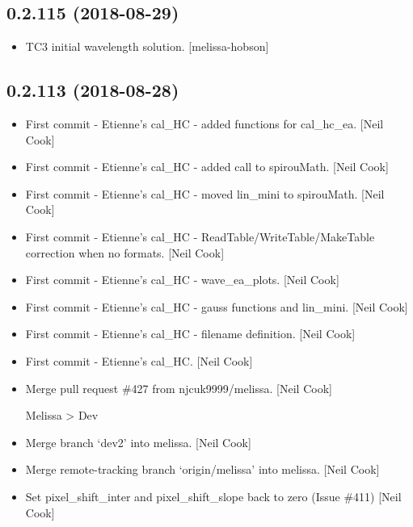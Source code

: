 \documentclass[a4paper,10pt,english]{report}
\begin{document}
\subsection{0.2.115 (2018-08-29)}
\label{\detokenize{misc/changelog:id345}}\begin{itemize}
\item {} 
TC3 initial wavelength solution. {[}melissa-hobson{]}

\end{itemize}


\subsection{0.2.113 (2018-08-28)}
\label{\detokenize{misc/changelog:id346}}\begin{itemize}
\item {} 
First commit - Etienne’s cal\_HC - added functions for cal\_hc\_ea. {[}Neil
Cook{]}

\item {} 
First commit - Etienne’s cal\_HC - added call to spirouMath. {[}Neil
Cook{]}

\item {} 
First commit - Etienne’s cal\_HC - moved lin\_mini to spirouMath. {[}Neil
Cook{]}

\item {} 
First commit - Etienne’s cal\_HC - ReadTable/WriteTable/MakeTable
correction when no formats. {[}Neil Cook{]}

\item {} 
First commit - Etienne’s cal\_HC - wave\_ea\_plots. {[}Neil Cook{]}

\item {} 
First commit - Etienne’s cal\_HC - gauss functions and lin\_mini. {[}Neil
Cook{]}

\item {} 
First commit - Etienne’s cal\_HC - filename definition. {[}Neil Cook{]}

\item {} 
First commit - Etienne’s cal\_HC. {[}Neil Cook{]}

\item {} 
Merge pull request \#427 from njcuk9999/melissa. {[}Neil Cook{]}

Melissa \textendash{}\textgreater{} Dev

\item {} 
Merge branch ‘dev2’ into melissa. {[}Neil Cook{]}

\item {} 
Merge remote-tracking branch ‘origin/melissa’ into melissa. {[}Neil
Cook{]}

\item {} 
Set pixel\_shift\_inter and pixel\_shift\_slope back to zero (Issue \#411)
{[}Neil Cook{]}

\end{itemize}
\end{document}
